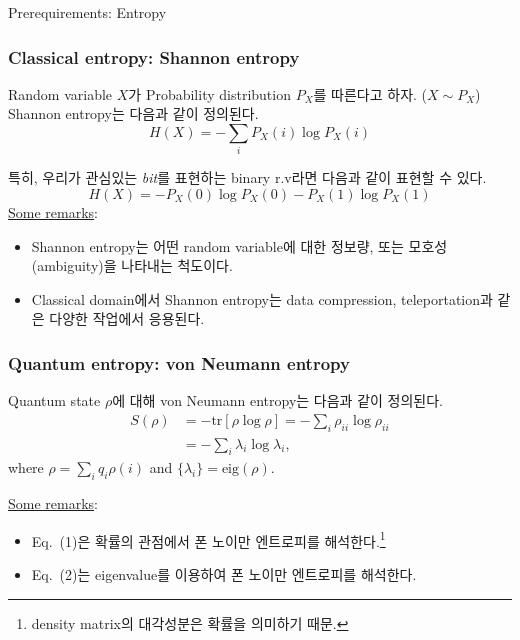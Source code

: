 \documentclass[9pt]{beamer}
\begin{document}
    \begin{section}{Prerequirements: Entropy}
        \begin{frame}
            \frametitle{Classical entropy: Shannon entropy}
            \begin{definition}
                Random variable $X$가 Probability distribution $P_X$를 따른다고 하자. ($X \sim P_X$) Shannon entropy는 다음과 같이 정의된다.
                \begin{equation*}
                    H(X) = - \sum_i P_X(i) \log P_X(i)
                \end{equation*}
            \end{definition}
            특히, 우리가 관심있는 \textit{bit}를 표현하는 binary r.v라면 다음과 같이 표현할 수 있다.
            \begin{equation*}
                H(X) = -P_X(0) \log P_X(0) - P_X(1) \log P_X(1)
            \end{equation*}
            \underline{Some remarks}:
            \begin{itemize}
                \item Shannon entropy는 어떤 random variable에 대한 정보량, 또는 모호성(ambiguity)을 나타내는 척도이다.
                \item Classical domain에서 Shannon entropy는 data compression, teleportation과 같은 다양한 작업에서 응용된다.
            \end{itemize}
        \end{frame}

        \begin{frame}
            \frametitle{Quantum entropy: von Neumann entropy}
            \begin{definition}
                Quantum state $\rho$에 대해 von Neumann entropy는 다음과 같이 정의된다.
                \begin{align}
                    S(\rho) &= - \text{tr}[\rho \log \rho] = -\sum_i \rho_{ii} \log \rho_{ii} \\
                            &= - \sum_i \lambda_i \log \lambda_i,
                \end{align}
                where $\rho = \sum_i q_i \rho(i)$ and $\{\lambda_i\} = \text{eig}(\rho)$.
            \end{definition}
            \vspace{0.2cm}
            \underline{Some remarks}:
            \begin{itemize}
                \item Eq.~(1)은 확률의 관점에서 폰 노이만 엔트로피를 해석한다.\footnote{density matrix의 대각성분은 확률을 의미하기 때문.}
                \item Eq.~(2)는 eigenvalue를 이용하여 폰 노이만 엔트로피를 해석한다.
            \end{itemize}
        \end{frame}
    \end{section}
    
\end{document}
